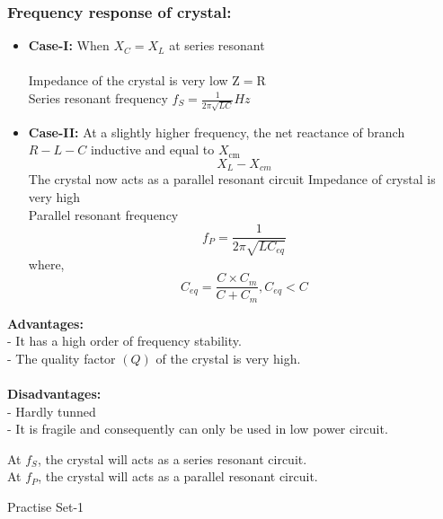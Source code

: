 \subsubsection{Frequency response of crystal:}
\begin{itemize}
	\item \textbf{Case-I:} When $X_{C}=X_{L}$ at series resonant\\\\
	Impedance of the crystal is very low $\mathrm{Z}=\mathrm{R}$\\
	Series resonant frequency $f_{S}=\frac{1}{2 \pi \sqrt{L C}} H z$\\
	\item \textbf{Case-II:} At a slightly higher frequency, the net reactance of branch $R-L-C$ inductive and equal to $X_{\mathrm{cm}}$
	$$
	X_{L}-X_{c m}
	$$
	The crystal now acts as a parallel resonant circuit Impedance of crystal is very high\\
	Parallel resonant frequency\\
	$$f_{P}=\frac{1}{2 \pi \sqrt{L C_{e q}}}$$ where, $$C_{e q}=\frac{C \times C_{m}}{C+C_{m}}, C_{e q}<C$$
\end{itemize}
\textbf{Advantages:}\\
- It has a high order of frequency stability.\\
- The quality factor $(Q)$ of the crystal is very high. \\\\
\textbf{Disadvantages:}\\
- Hardly tunned\\
- It is fragile and consequently can only be used in low power circuit.
\begin{note}
 At $f_{S}$, the crystal will acts as a series resonant circuit.\\
At $f_{P}$, the crystal will acts as a parallel resonant circuit. 
\end{note}
\newpage
\begin{abox}
	Practise Set-1
	\end{abox}
